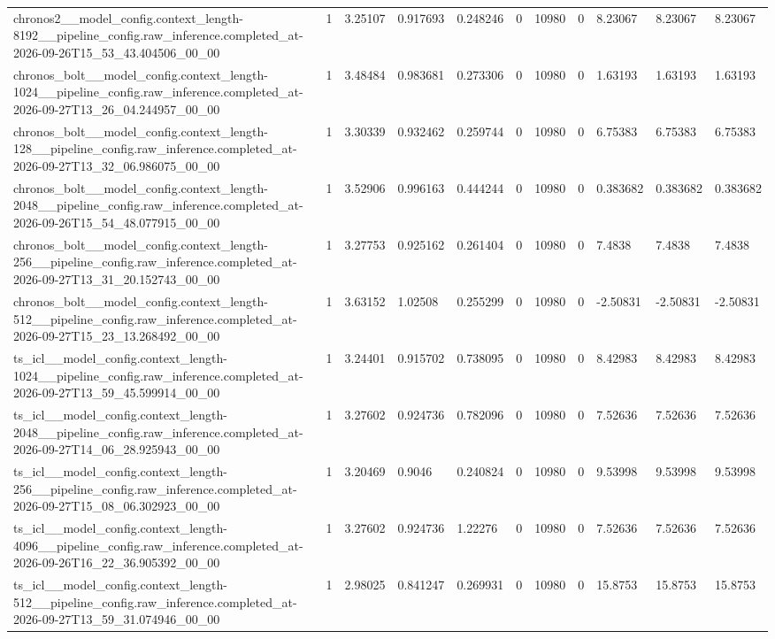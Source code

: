 \begin{tabular}{lllllllllll}
chronos2\_\_model\_config.context\_length-8192\_\_pipeline\_config.raw\_inference.completed\_at-2026-09-26T15\_53\_43.404506\_00\_00 & 1 & 3.25107 & 0.917693 & 0.248246 & 0 & 10980 & 0 & 8.23067 & 8.23067 & 8.23067 \\
chronos\_bolt\_\_model\_config.context\_length-1024\_\_pipeline\_config.raw\_inference.completed\_at-2026-09-27T13\_26\_04.244957\_00\_00 & 1 & 3.48484 & 0.983681 & 0.273306 & 0 & 10980 & 0 & 1.63193 & 1.63193 & 1.63193 \\
chronos\_bolt\_\_model\_config.context\_length-128\_\_pipeline\_config.raw\_inference.completed\_at-2026-09-27T13\_32\_06.986075\_00\_00 & 1 & 3.30339 & 0.932462 & 0.259744 & 0 & 10980 & 0 & 6.75383 & 6.75383 & 6.75383 \\
chronos\_bolt\_\_model\_config.context\_length-2048\_\_pipeline\_config.raw\_inference.completed\_at-2026-09-26T15\_54\_48.077915\_00\_00 & 1 & 3.52906 & 0.996163 & 0.444244 & 0 & 10980 & 0 & 0.383682 & 0.383682 & 0.383682 \\
chronos\_bolt\_\_model\_config.context\_length-256\_\_pipeline\_config.raw\_inference.completed\_at-2026-09-27T13\_31\_20.152743\_00\_00 & 1 & 3.27753 & 0.925162 & 0.261404 & 0 & 10980 & 0 & 7.4838 & 7.4838 & 7.4838 \\
chronos\_bolt\_\_model\_config.context\_length-512\_\_pipeline\_config.raw\_inference.completed\_at-2026-09-27T15\_23\_13.268492\_00\_00 & 1 & 3.63152 & 1.02508 & 0.255299 & 0 & 10980 & 0 & -2.50831 & -2.50831 & -2.50831 \\
ts\_icl\_\_model\_config.context\_length-1024\_\_pipeline\_config.raw\_inference.completed\_at-2026-09-27T13\_59\_45.599914\_00\_00 & 1 & 3.24401 & 0.915702 & 0.738095 & 0 & 10980 & 0 & 8.42983 & 8.42983 & 8.42983 \\
ts\_icl\_\_model\_config.context\_length-2048\_\_pipeline\_config.raw\_inference.completed\_at-2026-09-27T14\_06\_28.925943\_00\_00 & 1 & 3.27602 & 0.924736 & 0.782096 & 0 & 10980 & 0 & 7.52636 & 7.52636 & 7.52636 \\
ts\_icl\_\_model\_config.context\_length-256\_\_pipeline\_config.raw\_inference.completed\_at-2026-09-27T15\_08\_06.302923\_00\_00 & 1 & 3.20469 & 0.9046 & 0.240824 & 0 & 10980 & 0 & 9.53998 & 9.53998 & 9.53998 \\
ts\_icl\_\_model\_config.context\_length-4096\_\_pipeline\_config.raw\_inference.completed\_at-2026-09-26T16\_22\_36.905392\_00\_00 & 1 & 3.27602 & 0.924736 & 1.22276 & 0 & 10980 & 0 & 7.52636 & 7.52636 & 7.52636 \\
ts\_icl\_\_model\_config.context\_length-512\_\_pipeline\_config.raw\_inference.completed\_at-2026-09-27T13\_59\_31.074946\_00\_00 & 1 & 2.98025 & 0.841247 & 0.269931 & 0 & 10980 & 0 & 15.8753 & 15.8753 & 15.8753 \\

\end{tabular}
